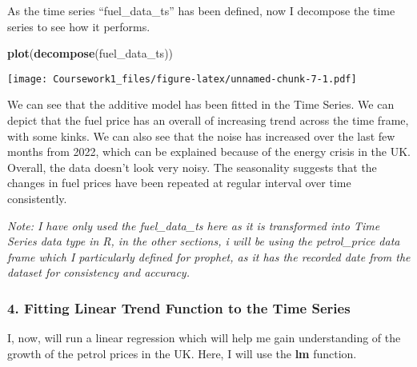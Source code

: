 \documentclass[
]{article}
\newenvironment{Shaded}{\begin{snugshade}}{\end{snugshade}}
\newcommand{\AttributeTok}[1]{\textcolor[rgb]{0.13,0.29,0.53}{#1}}
\newcommand{\FunctionTok}[1]{\textcolor[rgb]{0.13,0.29,0.53}{\textbf{#1}}}
\newcommand{\NormalTok}[1]{#1}
\newcommand{\OtherTok}[1]{\textcolor[rgb]{0.56,0.35,0.01}{#1}}
\newcommand{\SpecialCharTok}[1]{\textcolor[rgb]{0.81,0.36,0.00}{\textbf{#1}}}
\newcommand{\StringTok}[1]{\textcolor[rgb]{0.31,0.60,0.02}{#1}}
\begin{document}
As the time series ``fuel\_data\_ts'' has been defined, now I decompose
the time series to see how it performs.

\begin{Shaded}
\begin{Highlighting}[]
\FunctionTok{plot}\NormalTok{(}\FunctionTok{decompose}\NormalTok{(fuel\_data\_ts))}
\end{Highlighting}
\end{Shaded}

\texttt{[image: Coursework1\_files/figure-latex/unnamed-chunk-7-1.pdf]}

We can see that the additive model has been fitted in the Time Series.
We can depict that the fuel price has an overall of increasing trend
across the time frame, with some kinks. We can also see that the noise
has increased over the last few months from 2022, which can be explained
because of the energy crisis in the UK. Overall, the data doesn't look
very noisy. The seasonality suggests that the changes in fuel prices
have been repeated at regular interval over time consistently.

\emph{Note: I have only used the fuel\_data\_ts here as it is
transformed into Time Series data type in R, in the other sections, i
will be using the petrol\_price data frame which I particularly defined
for prophet, as it has the recorded date from the dataset for
consistency and accuracy.}

\hypertarget{fitting-linear-trend-function-to-the-time-series}{%
\subsubsection{4. Fitting Linear Trend Function to the Time
Series}\label{fitting-linear-trend-function-to-the-time-series}}

I, now, will run a linear regression which will help me gain
understanding of the growth of the petrol prices in the UK. Here, I will
use the \textbf{lm} function.

\begin{Shaded}
\end{Shaded}
\end{document}
